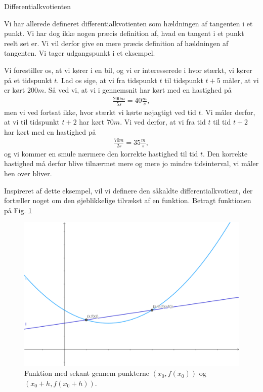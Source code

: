 
\begin{center}
	\Huge
	Differentialkvotienten
\end{center}


Vi har allerede defineret differentialkvotienten som hældningen af tangenten i et punkt.  Vi har dog ikke nogen præcis definition af, hvad en tangent i et punkt reelt set er. Vi vil derfor give en mere præcis definition af hældningen af tangenten. Vi tager udgangspunkt i et eksempel.

\begin{exa}
Vi forestiller os, at vi kører i en bil, og vi er interesserede i hvor stærkt, vi kører på et tidspunkt $t$. Lad os sige, at vi fra tidspunkt $t$ til tidspunkt $t+5$ måler, at vi er kørt $200m$. Så ved vi, at vi i gennemsnit har kørt med en hastighed på
\begin{align*}
\frac{200m}{5s} = 40\frac{m}{s},
\end{align*} 
men vi ved fortsat ikke, hvor stærkt vi kørte nøjagtigt ved tid $t$. Vi måler derfor, at vi til tidspunkt $t+2$ har kørt $70m$. Vi ved derfor, at vi fra tid $t$ til tid $t+2$ har kørt med en hastighed på 
\begin{align*}
\frac{70m}{2s} = 35\frac{m}{s},
\end{align*}
og vi kommer en smule nærmere den korrekte hastighed til tid $t$. Den korrekte hastighed må derfor blive tilnærmet mere og mere jo mindre tidsinterval, vi måler hen over bliver. 
\end{exa}
Inspireret af dette eksempel, vil vi definere den såkaldte differentialkvotient, der fortæller noget om den øjeblikkelige tilvækst af en funktion. 
Betragt funktionen på Fig. \ref{fig:sek1}
\begin{figure}[H]
\centering
\includegraphics[width = 12cm]{Billeder/sekant1.png}
\caption{Funktion med sekant gennem punkterne $(x_0,f(x_0))$ og $(x_0+h,f(x_0+h))$.}
\label{fig:sek1}
\end{figure}
